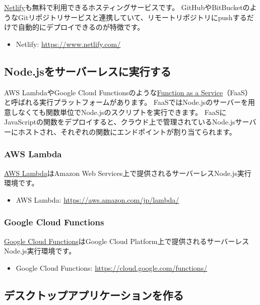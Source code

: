 \href{https://www.netlify.com/}{Netlify}も無料で利用できるホスティングサービスです。
GitHubやBitBucketのようなGitリポジトリサービスと連携していて、リモートリポジトリにpushするだけで自動的にデプロイできるのが特徴です。
\begin{itemize}
\item Netlify: \url{https://www.netlify.com/}
\end{itemize}

\hypertarget{serverless}{%
\subsection{Node.jsをサーバーレスに実行する}\label{serverless}}

AWS LambdaやGoogle Cloud
Functionsのような\href{https://en.wikipedia.org/wiki/Function_as_a_service}{Function
as a Service}（FaaS）と呼ばれる実行プラットフォームがあります。
FaaSではNode.jsのサーバーを用意しなくても関数単位でNode.jsのスクリプトを実行できます。
FaaSにJavaScriptの関数をデプロイすると、クラウド上で管理されているNode.jsサーバーにホストされ、それぞれの関数にエンドポイントが割り当てられます。

\hypertarget{aws-lambda}{%
\subsubsection{AWS Lambda}\label{aws-lambda}}

\href{https://aws.amazon.com/jp/lambda/}{AWS Lambda}はAmazon Web
Services上で提供されるサーバーレスNode.js実行環境です。
\begin{itemize}
\item AWS Lambda: \url{https://aws.amazon.com/jp/lambda/}
\end{itemize}

\hypertarget{google-cloud-functions}{%
\subsubsection{Google Cloud Functions}\label{google-cloud-functions}}

\href{https://cloud.google.com/functions/}{Google Cloud
Functions}はGoogle Cloud
Platform上で提供されるサーバーレスNode.js実行環境です。
\begin{itemize}
\item Google Cloud Functions: \url{https://cloud.google.com/functions/}
\end{itemize}

\hypertarget{desktop-app}{%
\subsection{デスクトップアプリケーションを作る}\label{desktop-app}}

